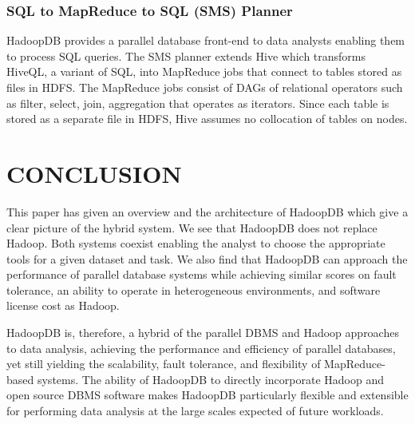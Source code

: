\documentclass[9pt,twocolumn,twoside]{styles/osajnl}
\begin{document}
\subsubsection{SQL to MapReduce to SQL (SMS) Planner}
HadoopDB provides a parallel database front-end to data analysts enabling them to process SQL queries. The SMS planner extends Hive\cite{facebook-hive} which transforms HiveQL, a variant of SQL, into MapReduce jobs that connect to tables stored
as files in HDFS. The MapReduce jobs consist of DAGs of relational operators such as filter, select, join, aggregation that operates as iterators. Since each table is stored as a
separate file in HDFS, Hive assumes no collocation of tables on nodes.


\section{CONCLUSION}

This paper has given an overview and the architecture of HadoopDB which give a clear picture of the hybrid system. We see that HadoopDB does not replace Hadoop. Both systems coexist enabling the analyst to choose the appropriate tools for a given dataset and task.  We also find that HadoopDB can approach the performance of parallel database systems while achieving similar scores on fault tolerance, an ability to operate in heterogeneous environments, and software license cost as Hadoop. 

HadoopDB is, therefore, a hybrid of the parallel DBMS and Hadoop approaches to data analysis, achieving the performance and efficiency of parallel databases, yet still yielding the scalability, fault tolerance, and flexibility of MapReduce-based systems. The ability of HadoopDB to directly incorporate Hadoop and open source DBMS software makes HadoopDB particularly flexible and extensible for performing data
analysis at the large scales expected of future workloads.


\end{document}
